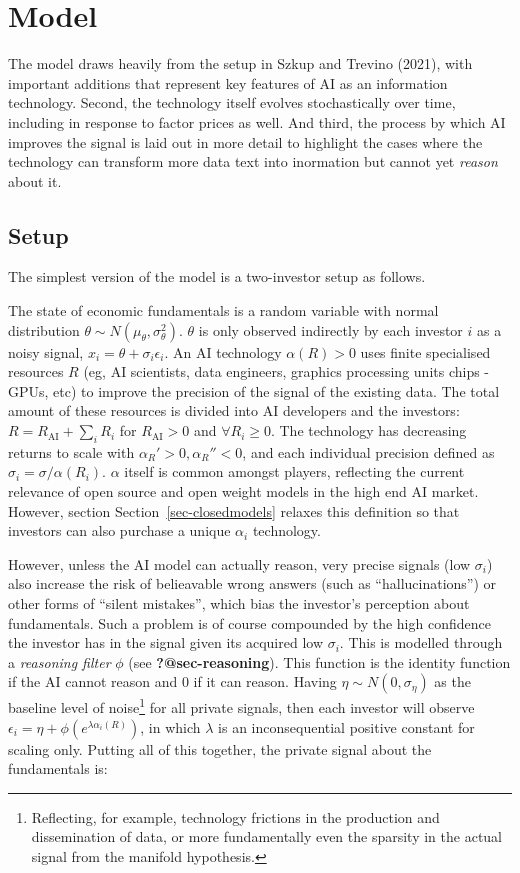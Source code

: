 \documentclass[
]{article}
\theoremstyle{definition}
\theoremstyle{plain}
\theoremstyle{remark}
\begin{document}
\section{Model}\label{model}

The model draws heavily from the setup in Szkup and Trevino (2021), with
important additions that represent key features of AI as an information
technology. Second, the technology itself evolves stochastically over
time, including in response to factor prices as well. And third, the
process by which AI improves the signal is laid out in more detail to
highlight the cases where the technology can transform more data text
into inormation but cannot yet \emph{reason} about it.

\subsection{Setup}\label{setup}

The simplest version of the model is a two-investor setup as follows.

The state of economic fundamentals is a random variable with normal
distribution \(\theta \sim N(\mu_\theta, \sigma_\theta^2)\). \(\theta\)
is only observed indirectly by each investor \(i\) as a noisy signal,
\(x_i = \theta + \sigma_i \epsilon_i\). An AI technology
\(\alpha(R) > 0\) uses finite specialised resources \(R\) (eg, AI
scientists, data engineers, graphics processing units chips - GPUs, etc)
to improve the precision of the signal of the existing data. The total
amount of these resources is divided into AI developers and the
investors: \(R = R_{\text{AI}} + \sum_{i} R_i\) for
\(R_{\text{AI}} > 0\) and \(\forall R_i \geq 0\). The technology has
decreasing returns to scale with \(\alpha_R' > 0, \alpha_R'' < 0\), and
each individual precision defined as
\(\sigma_i = \sigma / \alpha(R_i)\). \(\alpha\) itself is common amongst
players, reflecting the current relevance of open source and open weight
models in the high end AI market. However, section
Section~\ref{sec-closedmodels} relaxes this definition so that investors
can also purchase a unique \(\alpha_i\) technology.

However, unless the AI model can actually reason, very precise signals
(low \(\sigma_i\)) also increase the risk of belieavable wrong answers
(such as ``hallucinations'') or other forms of ``silent mistakes'',
which bias the investor's perception about fundamentals. Such a problem
is of course compounded by the high confidence the investor has in the
signal given its acquired low \(\sigma_i\). This is modelled through a
\emph{reasoning filter} \(\phi\) (see \textbf{?@sec-reasoning}). This
function is the identity function if the AI cannot reason and 0 if it
can reason. Having \(\eta \sim N(0, \sigma_\eta)\) as the baseline level
of noise\footnote{Reflecting, for example, technology frictions in the
  production and dissemination of data, or more fundamentally even the
  sparsity in the actual signal from the manifold hypothesis.} for all
private signals, then each investor will observe
\(\epsilon_i = \eta + \phi(e^{\lambda \alpha_i(R)})\), in which
\(\lambda\) is an inconsequential positive constant for scaling only.
Putting all of this together, the private signal about the fundamentals
is:
\end{document}
